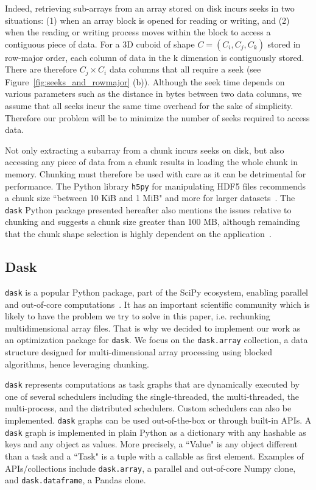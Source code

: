 \documentclass[conference]{IEEEtran}
\begin{document}
Indeed, retrieving sub-arrays from an array stored on disk incurs seeks in two
situations: (1) when an array block is opened for reading or writing, and (2)
when the reading or writing process moves within the block to access a
contiguous piece of data. For a 3D cuboid of shape $C = (C_i, C_j, C_k)$ stored
in row-major order, each column of data in the k dimension is contiguously
stored. There are therefore $C_j \times C_i$ data columns that all require a
seek (see Figure~\ref{fig:seeks_and_rowmajor} (b)).
Although the seek time depends on various parameters such as the distance
in bytes between two data columns, we assume that all seeks incur the same time
overhead for the sake of simplicity. Therefore our problem will be to minimize
the number of seeks required to access data.

Not only extracting a subarray from a chunk incurs seeks on disk, but also
accessing any piece of data from a chunk results in loading the whole chunk in
memory. Chunking must therefore be used with care as it can be detrimental for
performance. The Python library \texttt{h5py} for manipulating HDF5 files
recommends a chunk size ``between 10 KiB and 1 MiB" and more for larger
datasets~\cite{collette_2014}. The \texttt{dask} Python package presented
hereafter also mentions the issues relative to chunking and suggests a chunk
size greater than 100 MB, although remainding that the chunk shape selection is
highly dependent on the application~\cite{rocklin_bourbeau_2019}.

\subsection{Dask}
\texttt{dask} is a popular Python package, part of the SciPy ecosystem, enabling parallel
and out-of-core computations~\cite{matthew_rocklin-proc-scipy-2015}. It has an
important scientific community which is likely to have the problem we try to
solve in this paper, i.e. rechunking multidimensional array files. That is why
we decided to implement our work as an optimization package for \texttt{dask}.
We focus on the \texttt{dask.array} collection, a data structure designed for
multi-dimensional array processing using blocked algorithms, hence leveraging
chunking.

\texttt{dask} represents computations as task graphs that are dynamically executed by one
of several schedulers including the single-threaded, the multi-threaded, the
multi-process, and the distributed schedulers. Custom schedulers can also be
implemented. \texttt{dask} graphs can be used out-of-the-box or through
built-in APIs. A \texttt{dask} graph is implemented in plain Python as a
dictionary with any hashable as keys and any object as values. More precisely,
a ``Value" is any object different than a task and a ``Task" is a tuple with a
callable as first element. Examples of APIs/collections include
\texttt{dask.array}, a parallel and out-of-core
Numpy clone, and \texttt{dask.dataframe}, a Pandas clone.
\end{document}
